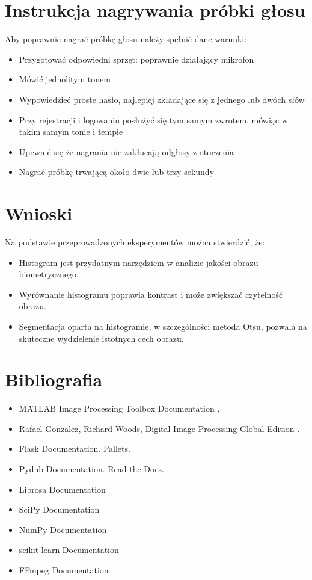 \section{Instrukcja nagrywania próbki głosu}
Aby poprawnie nagrać próbkę głosu należy spełnić dane warunki:
\begin{itemize}
	\item Przygotować odpowiedni sprzęt: poprawnie działający mikrofon
	\item Mówić jednolitym tonem 
	\item Wypowiedzieć proste hasło, najlepiej zkładające się z jednego lub dwóch słów
	\item Przy rejestracji i logowaniu posłużyć się tym samym zwrotem, mówiąc w takim samym tonie i tempie
	\item Upewnić się że nagrania nie zakłucają odgłosy z otoczenia
	\item Nagrać próbkę trwającą około dwie lub trzy sekundy
	
\end{itemize}


\section{Wnioski}
Na podstawie przeprowadzonych eksperymentów można stwierdzić, że:
\begin{itemize}
    \item Histogram jest przydatnym narzędziem w analizie jakości obrazu biometrycznego.
    \item Wyrównanie histogramu poprawia kontrast i może zwiększać czytelność obrazu.
    \item Segmentacja oparta na histogramie, w szczególności metoda Otsu, pozwala na skuteczne wydzielenie istotnych cech obrazu.
\end{itemize}

\section{Bibliografia}
\begin{itemize}
    \item MATLAB Image Processing Toolbox Documentation \cite{mathworks},
    \item Rafael Gonzalez, Richard Woods, Digital Image Processing Global Edition \cite{gonzalez2017}.
    \item Flask Documentation. Pallets.  \cite{flask_docs}
    \item Pydub Documentation. Read the Docs.  \cite{pydub_docs}
    \item Librosa Documentation  \cite{librosa_docs}
    \item SciPy Documentation  \cite{scipy_docs}
    \item NumPy Documentation \cite{numpy_docs}
    \item scikit-learn Documentation  \cite{scikitlearn_docs}
    \item FFmpeg Documentation  \cite{ffmpeg_docs}
    
\end{itemize}
